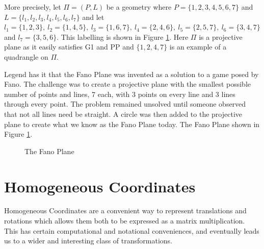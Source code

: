 \documentclass{article}
\theoremstyle{definition}
\begin{document}
\bigskip
\noindent
More precisely, let $\Pi = (P,L)$ be a geometry where $P = \{1,2,3,4,5,6,7\}$ and $L = \{l_1,l_2,l_3,l_4,l_5,l_6,l_7\}$ and let 
$l_1 = \{1,2,3\}, \:  l_2 = \{1,4,5\}, \:  l_3 = \{1,6,7\}, \: l_4 = \{2,4,6\},  \: l_5 = \{2,5,7\},  \: l_6 = \{3,4,7\}$ and $l_7 = \{3,5,6\}$. This labelling
is shown in Figure \ref{fig:fano_plane}. Here $\Pi$  is a projective plane as it easily satisfies G1 and PP and  $\{1, 2, 4, 7\}$ is an example 
of a quadrangle on $\Pi$.

\bigskip
\noindent
Legend has it that the Fano Plane was invented as a solution to a game posed by Fano. The challenge was to create a projective 
plane with the smallest possible number of points and lines, 7 each, with 3 points on every line and 3 lines through every point. 
The problem remained unsolved until someone observed that not all lines need be straight. A circle was then added to the projective plane to create what we know
 as the Fano Plane today. The Fano Plane shown in Figure \ref{fig:fano_plane}.

\bigskip
\begin{figure}[H]
\caption{The Fano Plane}
\label{fig:fano_plane}
\end{figure}


\section {Homogeneous Coordinates}
Homogeneous Coordinates are a convenient way to represent translations and rotations which allows them both to be expressed as a matrix multiplication. This has certain computational and notational conveniences, and eventually leads us to a wider and interesting class of transformations. 
\end{document}
